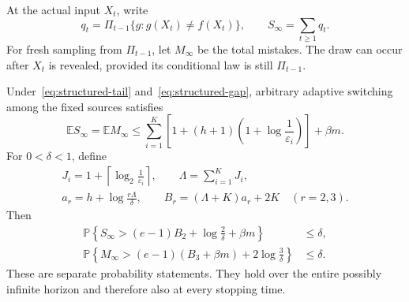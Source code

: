 At the actual input $X_t$, write
\[
 q_t=\Pi_{t-1}\{g:g(X_t)\ne f(X_t)\},\qquad
 S_\infty=\sum_{t\ge1}q_t.
\]
For fresh sampling from $\Pi_{t-1}$, let $M_\infty$ be the total mistakes.
The draw can occur after $X_t$ is revealed, provided its conditional law
is still $\Pi_{t-1}$.

\begin{theorem}
\label{thm:structured-posterior}
Under~\eqref{eq:structured-tail} and~\eqref{eq:structured-gap}, arbitrary
adaptive switching among the fixed sources satisfies
\begin{equation}\label{eq:structured-expectation}
 \mathbb E S_\infty=\mathbb E M_\infty
 \le \sum_{i=1}^K
 \left[1+(h+1)\left(1+\log\frac1{\varepsilon_i}\right)\right]
       +\beta m.
\end{equation}
For $0<\delta<1$, define
\begin{gather*}
 J_i=1+\left\lceil\log_2\frac1{\varepsilon_i}\right\rceil,
 \qquad \Lambda=\sum_{i=1}^KJ_i,
 \\
 a_r=h+\log\frac{r\Lambda}{\delta},
 \qquad B_r=(\Lambda+K)a_r+2K \quad(r=2,3).
\end{gather*}
Then
\begin{align}
 \mathbb P\left\{S_\infty>
       (e-1)B_2+\log\frac2\delta+\beta m\right\}
       &\le\delta,\label{eq:structured-S-tail}\\
 \mathbb P\left\{M_\infty>
       (e-1)(B_3+\beta m)+2\log\frac3\delta\right\}
       &\le\delta.\label{eq:structured-M-tail}
\end{align}
These are separate probability statements. They hold over the entire
possibly infinite horizon and therefore also at every stopping time.
\end{theorem}

